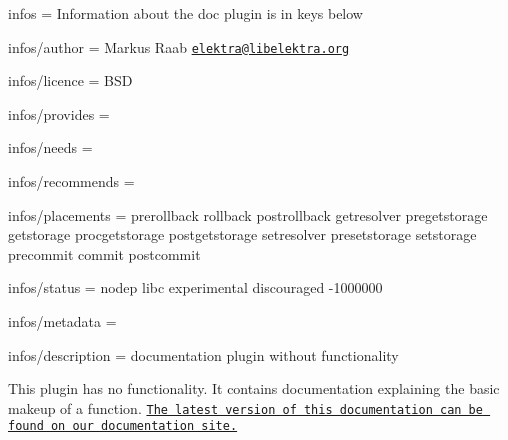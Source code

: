 
\begin{DoxyItemize}
\item infos = Information about the doc plugin is in keys below
\item infos/author = Markus Raab \href{mailto:elektra@libelektra.org}{\tt elektra@libelektra.\+org}
\item infos/licence = B\+SD
\item infos/provides =
\item infos/needs =
\item infos/recommends =
\item infos/placements = prerollback rollback postrollback getresolver pregetstorage getstorage procgetstorage postgetstorage setresolver presetstorage setstorage precommit commit postcommit
\item infos/status = nodep libc experimental discouraged -\/1000000
\item infos/metadata =
\item infos/description = documentation plugin without functionality
\end{DoxyItemize}

This plugin has no functionality. It contains documentation explaining the basic makeup of a function. \href{https://doc.libelektra.org/api/master/html/group__plugin.html}{\tt The latest version of this documentation can be found on our documentation site.} 